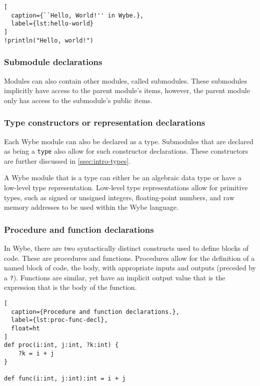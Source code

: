 \begin{lstlisting}[
  caption={``Hello, World!'' in Wybe.},
  label={lst:hello-world}
]
!println("Hello, world!")
\end{lstlisting}

\subsubsection*{Submodule declarations}

Modules can also contain other modules, called submodules. These submodules implicitly have access to the parent module's items, however, the parent module only has access to the submodule's public items.

\subsubsection*{Type constructors or representation declarations}

Each Wybe module can also be declared as a type. Submodules that are declared as being a \texttt{type} also allow for such constructor declarations. These constructors are further discussed in \cref{ssec:intro-types}.

A Wybe module that is a type can either be an algebraic data type or have a low-level type representation. Low-level type representations allow for primitive types, such as signed or unsigned integers, floating-point numbers, and raw memory addresses to be used within the Wybe language.

\subsubsection*{Procedure and function declarations}

In Wybe, there are two syntactically distinct constructs used to define blocks of code. These are procedures and functions. Procedures allow for the definition of a named block of code, the body, with appropriate inputs and outputs (preceded by a \texttt{?}). Functions are similar, yet have an implicit output value that is the expression that is the body of the function.

\begin{lstlisting}[
  caption={Procedure and function declarations.},
  label={lst:proc-func-decl},
  float=ht
]
def proc(i:int, j:int, ?k:int) {
    ?k = i + j
}

def func(i:int, j:int):int = i + j
\end{lstlisting}

